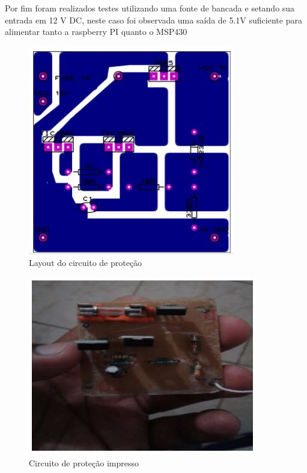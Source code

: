 Por fim foram realizados testes utilizando uma fonte de bancada e setando sua entrada em 12 V DC, neste caso foi observada  uma saída de 5.1V suficiente para alimentar tanto a raspberry PI quanto o MSP430

	\begin{figure}[H]
		\begin{center}
			\includegraphics[scale = 1]{figuras/Layout_Protecao}
			\caption{Layout do circuito de proteção}
		\end{center}
	\end{figure}
	
		\begin{figure}[H]
			\begin{center}
				\includegraphics[scale = 1]{figuras/Circuito_Impresso}
				\caption{Circuito de proteção impresso}
			\end{center}
		\end{figure}
